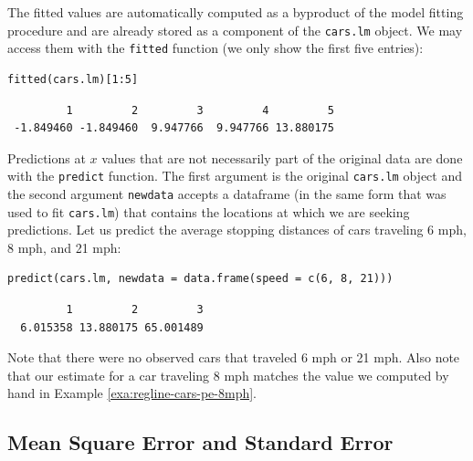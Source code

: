 \documentclass[captions=tableheading]{scrbook}
\begin{document}
The fitted values are automatically computed as a byproduct of the model fitting procedure and are already stored as a component of the \texttt{cars.lm} object. We may access them with the \texttt{fitted} function (we only show the first five entries):


\begin{verbatim}
fitted(cars.lm)[1:5]
\end{verbatim}

\begin{verbatim}
         1         2         3         4         5 
 -1.849460 -1.849460  9.947766  9.947766 13.880175
\end{verbatim}

Predictions at \(x\) values that are not necessarily part of the original data are done with the \texttt{predict} function. The first argument is the original \texttt{cars.lm} object and the second argument \texttt{newdata} accepts a dataframe (in the same form that was used to fit \texttt{cars.lm}) that contains the locations at which we are seeking predictions. Let us predict the average stopping distances of cars traveling 6 mph, 8 mph, and 21 mph:


\begin{verbatim}
predict(cars.lm, newdata = data.frame(speed = c(6, 8, 21)))
\end{verbatim}

\begin{verbatim}
         1         2         3 
  6.015358 13.880175 65.001489
\end{verbatim}

Note that there were no observed cars that traveled 6 mph or 21 mph. Also note that our estimate for a car traveling 8 mph matches the value we computed by hand in Example \ref{exa:regline-cars-pe-8mph}.
\subsection{Mean Square Error and Standard Error}
\label{sec-11-2-3}
\end{document}
